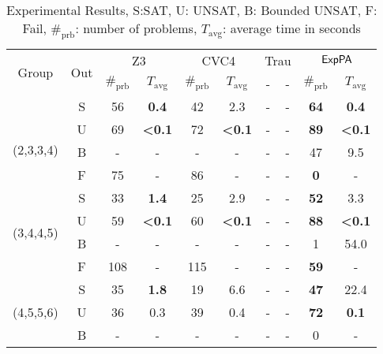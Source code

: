 
\begin{table}[ht]
        \caption{Experimental Results, S:SAT, U: UNSAT, B: Bounded UNSAT, F: Fail, 
    $\#_{\mathrm{prb}}$: number of problems, $T_{\mathrm{avg}}$: average time in seconds}
    \centering
    \renewcommand{\arraystretch}{1.2}
    \begin{tabular}{|c|c|c|c|c|c|c|c|c|c|}
    \hline
        \multirow{2}{*}{Group }  & \multirow{2}{*}{Out} & \multicolumn{2}{c|}{Z3} & \multicolumn{2}{c|}{CVC4} &  \multicolumn{2}{c|}{Trau} & \multicolumn{2}{c|}{${\sf ExpPA}$} \\
        \cline{3-10}
        &  & $\#_{\mathrm{prb}}$ & $T_{\mathrm{avg}}$  & $\#_{\mathrm{prb}}$ & $T_{\mathrm{avg}}$  & - & - & $\#_{\mathrm{prb}}$ & $T_{\mathrm{avg}}$  \\ \hline
        \multirow{4}{*}{
        \newline (2,3,3,4)} & S & 56 & {\bf 0.4} & 42 & 2.3 & - & - &  {\bf 64} & {\bf 0.4} \\
        \cline{2-10}
         & U & 69 & {\bf \textless{}0.1} & 72 &  {\bf \textless{}0.1} & - & - &  {\bf 89} & {\bf \textless{}0.1} \\
         \cline{2-10}
         & B & - & - & - & - & - & - &  47 & 9.5 \\
         \cline{2-10}
         & F & 75 & - & 86 & - & - & - &  {\bf 0} & - \\ \hline
         \cline{1-10}
        \multirow{4}{*}{(3,4,4,5)} & S & 33 & {\bf 1.4} & 25 & 2.9 & - & - &  {\bf 52} & 3.3 \\
        \cline{2-10}
         & U & 59 & {\bf \textless{}0.1} & 60 & {\bf \textless{}0.1} & - & - &  {\bf 88} & {\bf \textless{}0.1} \\
         \cline{2-10}
         & B & -  & - &  - & -  & - & - &  1 & 54.0 \\
         \cline{2-10}
         & F & 108 & - & 115 & - & - & - &  {\bf 59} & - \\ \hline
         \cline{1-10}
        \multirow{4}{*}{(4,5,5,6)} & S & 35 & {\bf 1.8} & 19 & 6.6 & - & - &  {\bf 47} & 22.4 \\
        \cline{2-10}
         & U & 36 & 0.3 & 39 & 0.4 & - & - &  {\bf 72} & {\bf 0.1} \\
         \cline{2-10}
         & B & -  & -  & - & - & - & - &  0 & - \\
         \cline{2-10}

\end{tabular}
\end{table}
